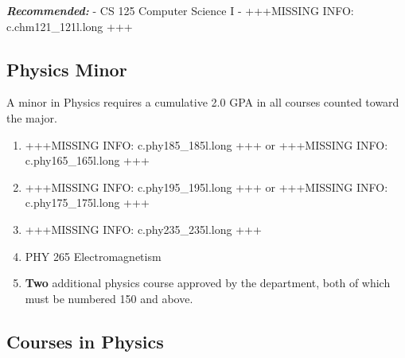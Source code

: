 \documentclass[
  letterpaper,
]{scrbook}
\begin{document}
\textbf{\emph{Recommended:}} - CS 125 Computer Science I - +++MISSING
INFO: c.chm121\_121l.long +++

\subsection{Physics Minor}\label{physics-minor}

A minor in Physics requires a cumulative 2.0 GPA in all courses counted
toward the major.

\begin{enumerate}
\def\labelenumi{\arabic{enumi}.}
\item
  +++MISSING INFO: c.phy185\_185l.long +++ or +++MISSING INFO:
  c.phy165\_165l.long +++
\item
  +++MISSING INFO: c.phy195\_195l.long +++ or +++MISSING INFO:
  c.phy175\_175l.long +++
\item
  +++MISSING INFO: c.phy235\_235l.long +++
\item
  PHY 265 Electromagnetism
\item
  \textbf{Two} additional physics course approved by the department,
  both of which must be numbered 150 and above.
\end{enumerate}

\subsection{Courses in Physics}\label{courses-in-physics}
\end{document}
